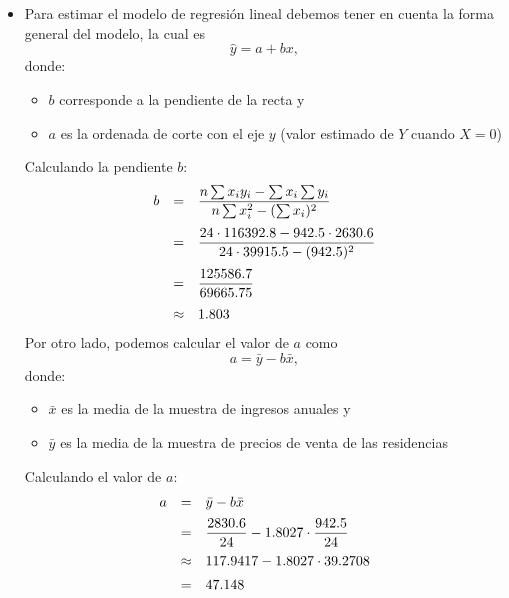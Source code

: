 \documentclass[12pt,a4paper]{article}
\begin{document}
\begin{itemize}
	\item [b)] Para estimar el modelo de regresión lineal debemos tener en cuenta la forma general del modelo, la cual es
    $$
    \hat{y} = a + bx,
    $$
    donde:
    \begin{itemize}
        \item [$\bullet$] $b$ corresponde a la pendiente de la recta y
        \item [$\bullet$] $a$ es la ordenada de corte con el eje $y$ (valor estimado de $Y$ cuando $X = 0$)
    \end{itemize}
    
    Calculando la pendiente $b$:
    $$
    \begin{array}{r c l}
         b & = & \dfrac{n\sum x_iy_i - \sum x_i \sum y_i}{n\sum x_i^2 - (\sum x_i)^2} \\
         \noalign{\vspace{7pt}}
         & = & \dfrac{24 \cdot 116392.8 - 942.5 \cdot 2630.6}{24 \cdot 39915.5 - (942.5)^2} \\
         \noalign{\vspace{7pt}}
         & = & \dfrac{125586.7}{69665.75} \\
         \noalign{\vspace{7pt}}
         & \approx & 1.803
    \end{array}
    $$
    \newline
    Por otro lado, podemos calcular el valor de $a$ como
    $$
        a = \bar{y} - b\bar{x},
    $$
    donde:
    \begin{itemize}
        \item [$\bullet$] $\bar{x}$ es la media de la muestra de ingresos anuales y
        \item [$\bullet$] $\bar{y}$ es la media de la muestra de precios de venta de las residencias
    \end{itemize}
    Calculando el valor de $a$:
    $$
    \begin{array}{r c l}
        a & = & \bar{y} - b\bar{x} \\
        \noalign{\vspace{5pt}}
         & = & \dfrac{2830.6}{24} - 1.8027 \cdot \dfrac{942.5}{24} \\
         \noalign{\vspace{5pt}}
         & \approx & 117.9417 - 1.8027 \cdot 39.2708 \\
         \noalign{\vspace{5pt}}
         & = & 47.148
    \end{array}
$$
\end{itemize}
\end{document}
